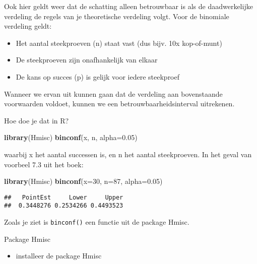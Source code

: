 \documentclass[]{book}
\newenvironment{Shaded}{\begin{snugshade}}{\end{snugshade}}
\newcommand{\KeywordTok}[1]{\textcolor[rgb]{0.13,0.29,0.53}{\textbf{{#1}}}}
\newcommand{\DataTypeTok}[1]{\textcolor[rgb]{0.13,0.29,0.53}{{#1}}}
\newcommand{\DecValTok}[1]{\textcolor[rgb]{0.00,0.00,0.81}{{#1}}}
\newcommand{\FloatTok}[1]{\textcolor[rgb]{0.00,0.00,0.81}{{#1}}}
\newcommand{\NormalTok}[1]{{#1}}
\providecommand{\tightlist}{%
  \setlength{\itemsep}{0pt}\setlength{\parskip}{0pt}}
\theoremstyle{definition}
\theoremstyle{definition}
\theoremstyle{definition}
\theoremstyle{remark}
\let\BeginKnitrBlock\begin \let\EndKnitrBlock\end
\begin{document}
Ook hier geldt weer dat de schatting alleen betrouwbaar is als de
daadwerkelijke verdeling de regels van je theoretische verdeling volgt.
Voor de binomiale verdeling geldt:

\begin{itemize}
\tightlist
\item
  Het aantal steekproeven (n) staat vast (dus bijv. 10x kop-of-munt)
\item
  De steekproeven zijn onafhankelijk van elkaar
\item
  De kans op succes (p) is gelijk voor iedere steekproef
\end{itemize}

Wanneer we ervan uit kunnen gaan dat de verdeling aan bovenstaande
voorwaarden voldoet, kunnen we een betrouwbaarheidsinterval uitrekenen.

Hoe doe je dat in R?

\begin{Shaded}
\begin{Highlighting}[]
\KeywordTok{library}\NormalTok{(Hmisc)}
\KeywordTok{binconf}\NormalTok{(x, n, }\DataTypeTok{alpha=}\FloatTok{0.05}\NormalTok{)}
\end{Highlighting}
\end{Shaded}

waarbij x het aantal successen is, en n het aantal steekproeven. In het
geval van voorbeel 7.3 uit het boek:

\begin{Shaded}
\begin{Highlighting}[]
\KeywordTok{library}\NormalTok{(Hmisc)}
\KeywordTok{binconf}\NormalTok{(}\DataTypeTok{x=}\DecValTok{30}\NormalTok{, }\DataTypeTok{n=}\DecValTok{87}\NormalTok{, }\DataTypeTok{alpha=}\FloatTok{0.05}\NormalTok{)}
\end{Highlighting}
\end{Shaded}

\begin{verbatim}
##   PointEst     Lower     Upper
##  0.3448276 0.2534266 0.4493523
\end{verbatim}

Zoals je ziet is \texttt{binconf()} een functie uit de package Hmisc.

\BeginKnitrBlock{exercise}
\protect\hypertarget{exr:Hmisc}{}{\label{exr:Hmisc} }Package Hmisc

\begin{itemize}
\tightlist
\item
  installeer de package Hmisc
\end{itemize}
\EndKnitrBlock{exercise}
\end{document}
